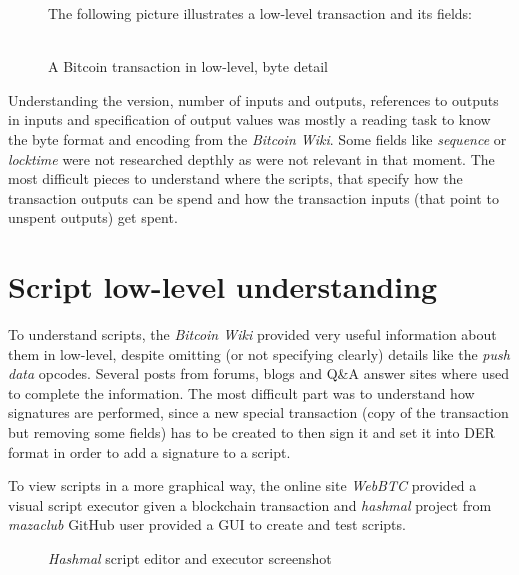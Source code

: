 \begin{figure}[H]
The following picture illustrates a low-level transaction and its fields:\\\\
  {\centering
  \caption{A Bitcoin transaction in low-level, byte detail\cite{bitcoin_wiki_raw_tx:online}}}
  \label{fig:raw-tx}
\end{figure}

Understanding the version, number of inputs and outputs, references to outputs in inputs and specification of output values was mostly a reading task to know the byte format and encoding from the \textit{Bitcoin Wiki}\cite{bitcoin_wiki_tx:online}. Some fields like \textit{sequence} or \textit{locktime} were not researched depthly as were not relevant in that moment. The most difficult pieces to understand where the scripts, that specify how the transaction outputs can be spend and how the transaction inputs (that point to unspent outputs) get spent. 

\section{Script low-level understanding}
To understand scripts, the \textit{Bitcoin Wiki}\cite{bitcoin_wiki_script:online} provided very useful information about them in low-level, despite omitting (or not specifying clearly) details like the \textit{push data} opcodes. Several posts from forums, blogs and Q\&A answer sites where used to complete the information\cite{siliconian_raw_tx:online, stackoverflow_raw_tx:online}. The most difficult part was to understand how signatures are performed, since a new special transaction (copy of the transaction but removing some fields) has to be created to then sign it and set it into DER format in order to add a signature to a script\cite{bitcoin_wiki_sign:online, stackoverflow_signature_der:online}.

To view scripts in a more graphical way, the online site \textit{WebBTC} provided a visual script executor given a blockchain transaction\cite{webbtc_script:online} and \textit{hashmal} project from \textit{mazaclub} GitHub user provided a GUI to create and test scripts\cite{hashmal:online}.
\begin{figure}[H]
  \centering
  \caption{\textit{Hashmal} script editor and executor screenshot}
  \label{fig:hashmal}
\end{figure}

